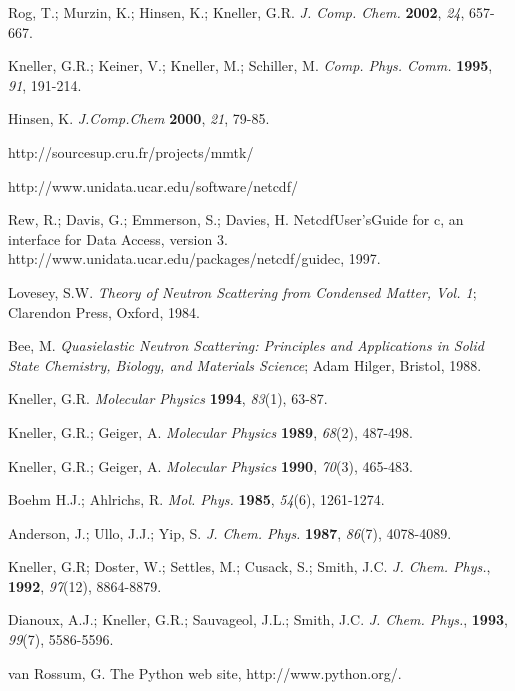 \documentclass[a4paper,11pt]{report}
\begin{document}
\newpage
{}
\begin{thebibliography}{99}

 Rog, T.; Murzin, K.; Hinsen, K.; Kneller, G.R. \textit{J. Comp. Chem.} \textbf{2002}, \textit{24}, 657-667.

 Kneller, G.R.; Keiner, V.; Kneller, M.; Schiller, M. \textit{Comp. Phys. Comm.} \textbf{1995}, \textit{91}, 191-214.

 Hinsen, K. \textit{J.Comp.Chem} \textbf{2000}, \textit{21}, 79-85.

 http://sourcesup.cru.fr/projects/mmtk/

 http://www.unidata.ucar.edu/software/netcdf/ 

 Rew, R.; Davis, G.; Emmerson, S.; Davies, H. NetcdfUser'sGuide for c, an interface for Data Access, version 3. http://www.unidata.ucar.edu/packages/netcdf/guidec, 1997. 

 Lovesey, S.W. \textit{Theory of Neutron Scattering from Condensed Matter, Vol. 1}; Clarendon Press, Oxford, 1984.

 Bee, M. \textit{Quasielastic Neutron Scattering: Principles and Applications in Solid State Chemistry, Biology, and Materials Science}; Adam Hilger, Bristol, 1988.

 Kneller, G.R. \textit{Molecular Physics} \textbf{1994}, \textit{83}(1), 63-87.

 Kneller, G.R.; Geiger, A. \textit{Molecular Physics} \textbf{1989}, \textit{68}(2), 487-498.

 Kneller, G.R.; Geiger, A. \textit{Molecular Physics} \textbf{1990}, \textit{70}(3), 465-483.

 Boehm H.J.; Ahlrichs, R. \textit{Mol. Phys.} \textbf{1985}, \textit{54}(6), 1261-1274.

 Anderson, J.; Ullo, J.J.; Yip, S. \textit{J. Chem. Phys.} \textbf{1987}, \textit{86}(7), 4078-4089.

 Kneller, G.R; Doster, W.; Settles, M.; Cusack, S.; Smith, J.C. \textit{J. Chem. Phys.}, \textbf{1992}, \textit{97}(12), 8864-8879.

 Dianoux, A.J.; Kneller, G.R.; Sauvageol, J.L.; Smith, J.C. \textit{J. Chem. Phys.}, \textbf{1993}, \textit{99}(7), 5586-5596.

 van Rossum, G. The Python web site, http://www.python.org/.


\end{thebibliography}
\end{document}
